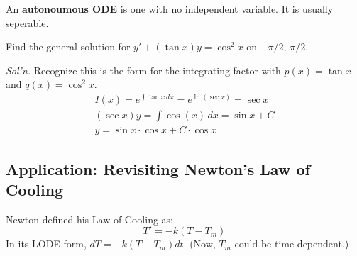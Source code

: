 \documentclass[../main.tex]{subfiles}
\begin{document}
An \textbf{autonoumous ODE} is one with no independent variable. It is usually seperable.

\begin{example}[]
    Find the general solution for \( y'+ ( \tan x ) y=\cos^{2}x \)  on \( -\pi/2,\, \pi/2 \).

    \textit{Sol'n.} Recognize this is the form for the integrating factor with \( p(x)=\tan x \) and \( q(x) = \cos^{2}x \).
    \begin{align*}
        I(x)= e^{\int \tan x \,dx} = e^{\ln(\sec x)} = \sec x \\
        (\sec x) y = \int \cos (x) \,dx = \sin x + C \\
        y = \sin x \cdot \cos x + C \cdot \cos x
    \end{align*}
\end{example}


\subsection{Application: Revisiting Newton's Law of Cooling}

Newton defined his Law of Cooling as:
\[ T' = -k(T-T_m) \]
In its LODE form, \( dT = -k(T-T_m)dt \). (Now, \( T_m \) could be time-dependent.)
\end{document}
